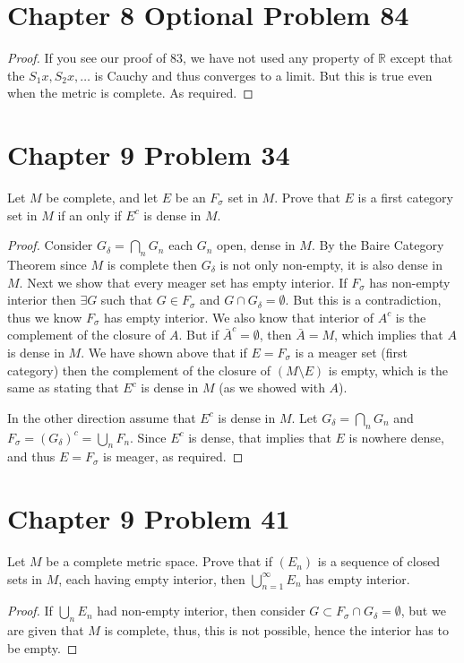 \documentclass{article}
\newtheorem{proof}{Proof}
\def\RR{\mathbb R}
\begin{document}
\section{Chapter 8 Optional Problem 84}
\begin{proof}
If you see our proof of 83, we have not used any property of $\RR$
except that the $S_1x,S_2x,\ldots$ is Cauchy and thus converges
to a limit. But this is true even when the metric is complete. As required.
\end{proof}

\section{Chapter 9 Problem 34}
Let $M$ be complete, and let $E$ be an $F_\sigma$ set in $M$. Prove
that $E$ is a first category set in $M$ if an only if $E^c$ is dense
in $M$.
\begin{proof}
Consider $G_\delta = \bigcap_n G_n$ each $G_n$ open, dense in $M$.
By the Baire Category Theorem since $M$ is complete then $G_\delta$
is not only non-empty, it is also dense in $M$. Next we show that
every meager set has empty interior. If $F_\sigma$ has non-empty
interior then $\exists G$ such that $G\in F_\sigma$ and $G\cap G_\delta=\emptyset$.
But this is a contradiction, thus we know $F_\sigma$ has empty interior.
We also know that interior of $A^c$ is the complement of the closure
of $A$. But if $\bar{A}^c=\emptyset$, then $\bar{A}=M$, which implies
that $A$ is dense in $M$. We have shown above that if $E=F_\sigma$ is a
meager set (first category) then the complement of the closure of 
$(M\setminus E)$ is empty, which is the same as stating that $E^c$ is
dense in $M$ (as we showed with $A$).

In the other direction assume that $E^c$ is dense in $M$. Let
$G_\delta = \bigcap_n G_n$ and $F_\sigma=(G_\delta)^c = \bigcup_n F_n$.
Since $E^c$ is dense, that implies that $E$ is nowhere dense, and thus
$E=F_\sigma$ is meager, as required.
\end{proof}

\section{Chapter 9 Problem 41}
Let $M$ be a complete metric space. Prove that if $(E_n)$ is a sequence
of closed sets in $M$, each having empty interior, then $\bigcup_{n=1}^\infty E_n$
has empty interior.
\begin{proof}
If $\bigcup_n E_n$ had non-empty interior, then consider 
$G \subset F_\sigma \cap G_\delta=\emptyset$, but we are given that $M$
is complete, thus, this is not possible, hence the interior has to be
empty.
\end{proof}
\end{document}
